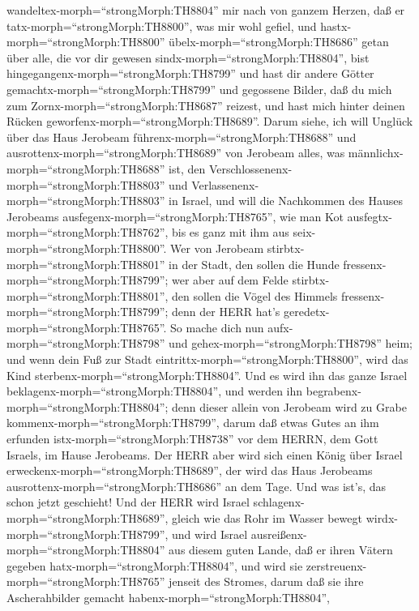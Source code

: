 wandeltex-morph=``strongMorph:TH8804'' mir nach von ganzem Herzen, daß
er tatx-morph=``strongMorph:TH8800'', was mir wohl gefiel, 
und hastx-morph=``strongMorph:TH8800''
übelx-morph=``strongMorph:TH8686'' getan über alle, die vor dir gewesen
sindx-morph=``strongMorph:TH8804'', bist
hingegangenx-morph=``strongMorph:TH8799'' und hast dir andere Götter
gemachtx-morph=``strongMorph:TH8799'' und gegossene Bilder, daß du mich
zum Zornx-morph=``strongMorph:TH8687'' reizest, und hast mich hinter
deinen Rücken geworfenx-morph=``strongMorph:TH8689''. 
Darum siehe, ich will Unglück über das Haus Jerobeam
führenx-morph=``strongMorph:TH8688'' und
ausrottenx-morph=``strongMorph:TH8689'' von Jerobeam alles, was
männlichx-morph=``strongMorph:TH8688'' ist, den
Verschlossenenx-morph=``strongMorph:TH8803'' und
Verlassenenx-morph=``strongMorph:TH8803'' in Israel, und will die
Nachkommen des Hauses Jerobeams ausfegenx-morph=``strongMorph:TH8765'',
wie man Kot ausfegtx-morph=``strongMorph:TH8762'', bis es ganz mit ihm
aus seix-morph=``strongMorph:TH8800''.  Wer von Jerobeam
stirbtx-morph=``strongMorph:TH8801'' in der Stadt, den sollen die Hunde
fressenx-morph=``strongMorph:TH8799''; wer aber auf dem Felde
stirbtx-morph=``strongMorph:TH8801'', den sollen die Vögel des Himmels
fressenx-morph=``strongMorph:TH8799''; denn der HERR hat's
geredetx-morph=``strongMorph:TH8765''.  So mache dich nun
aufx-morph=``strongMorph:TH8798'' und gehex-morph=``strongMorph:TH8798''
heim; und wenn dein Fuß zur Stadt
eintrittx-morph=``strongMorph:TH8800'', wird das Kind
sterbenx-morph=``strongMorph:TH8804''.  Und es wird ihn das
ganze Israel beklagenx-morph=``strongMorph:TH8804'', und werden ihn
begrabenx-morph=``strongMorph:TH8804''; denn dieser allein von Jerobeam
wird zu Grabe kommenx-morph=``strongMorph:TH8799'', darum daß etwas
Gutes an ihm erfunden istx-morph=``strongMorph:TH8738'' vor dem HERRN,
dem Gott Israels, im Hause Jerobeams.  Der HERR aber wird
sich einen König über Israel erweckenx-morph=``strongMorph:TH8689'', der
wird das Haus Jerobeams ausrottenx-morph=``strongMorph:TH8686'' an dem
Tage. Und was ist's, das schon jetzt geschieht!  Und der
HERR wird Israel schlagenx-morph=``strongMorph:TH8689'', gleich wie das
Rohr im Wasser bewegt wirdx-morph=``strongMorph:TH8799'', und wird
Israel ausreißenx-morph=``strongMorph:TH8804'' aus diesem guten Lande,
daß er ihren Vätern gegeben hatx-morph=``strongMorph:TH8804'', und wird
sie zerstreuenx-morph=``strongMorph:TH8765'' jenseit des Stromes, darum
daß sie ihre Ascherahbilder gemacht habenx-morph=``strongMorph:TH8804'',
